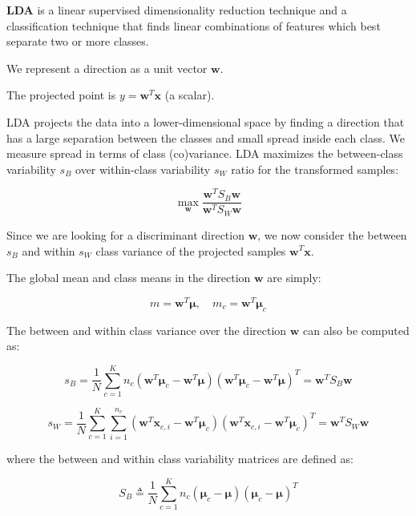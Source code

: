 \textbf{LDA} is a linear supervised dimensionality reduction technique and a classification technique that finds linear combinations of features which best separate two or more classes.

We represent a direction as a unit vector $\mathbf{w}$.

The projected point is $y = \mathbf{w}^T\mathbf{x}$ (a scalar).

LDA projects the data into a lower-dimensional space by finding a direction that has a large separation between the classes and small spread inside each class. We measure spread in terms of class (co)variance. LDA maximizes the between-class variability $s_B$ over within-class variability $s_W$ ratio for the transformed samples:

\begin{equation*}
\max_{\mathbf{w}} \frac{\mathbf{w}^T S_B \mathbf{w}}{\mathbf{w}^T S_W \mathbf{w}}
\end{equation*}

Since we are looking for a discriminant direction $\mathbf{w}$, we now consider the between $s_B$ and within $s_W$ class variance of the projected samples $\mathbf{w}^T\mathbf{x}$.

The global mean and class means in the direction $\mathbf{w}$ are simply:

\begin{equation*}
m = \mathbf{w}^T\boldsymbol{\mu}, \quad m_c = \mathbf{w}^T\boldsymbol{\mu}_c
\end{equation*}

The between and within class variance over the direction $\mathbf{w}$ can also be computed as:

\begin{equation*}
s_B = \frac{1}{N}\sum_{c=1}^{K} n_c (\mathbf{w}^T\boldsymbol{\mu}_c - \mathbf{w}^T\boldsymbol{\mu})(\mathbf{w}^T\boldsymbol{\mu}_c - \mathbf{w}^T\boldsymbol{\mu})^T = \mathbf{w}^T S_B \mathbf{w}
\end{equation*}

\begin{equation*}
s_W = \frac{1}{N}\sum_{c=1}^{K} \sum_{i=1}^{n_c} (\mathbf{w}^T\mathbf{x}_{c,i} - \mathbf{w}^T\boldsymbol{\mu}_c)(\mathbf{w}^T\mathbf{x}_{c,i} - \mathbf{w}^T\boldsymbol{\mu}_c)^T = \mathbf{w}^T S_W \mathbf{w}
\end{equation*}

where the between and within class variability matrices are defined as:

\begin{equation*}
S_B \triangleq \frac{1}{N}\sum_{c=1}^{K} n_c (\boldsymbol{\mu}_c - \boldsymbol{\mu})(\boldsymbol{\mu}_c - \boldsymbol{\mu})^T
\end{equation*}

